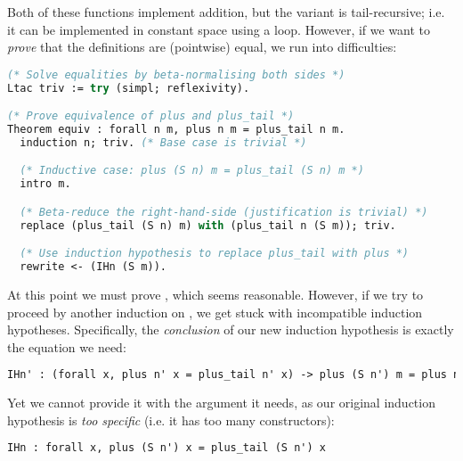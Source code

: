 \documentclass[]{article}
\begin{document}
\iffalse
Haskell equivalent:

plus :: Nat -> Nat -> Nat
plus      n  Z    = n
plus      n (S m) = S (plus n m)

plus_tail :: Nat -> Nat -> Nat
plus_tail n  Z    = n
plus_tail n (S m) = plus_tail (S n) m
\fi

Both of these functions implement addition, but the  variant is tail-recursive; i.e. it can be implemented in constant space using a loop. However, if we want to \emph{prove} that the definitions are (pointwise) equal, we run into difficulties:

\begin{lstlisting}[language=ML, xleftmargin=.2\textwidth, xrightmargin=.2\textwidth]
(* Solve equalities by beta-normalising both sides *)
Ltac triv := try (simpl; reflexivity).

(* Prove equivalence of plus and plus_tail *)
Theorem equiv : forall n m, plus n m = plus_tail n m.
  induction n; triv. (* Base case is trivial *)

  (* Inductive case: plus (S n) m = plus_tail (S n) m *)
  intro m.

  (* Beta-reduce the right-hand-side (justification is trivial) *)
  replace (plus_tail (S n) m) with (plus_tail n (S m)); triv.

  (* Use induction hypothesis to replace plus_tail with plus *)
  rewrite <- (IHn (S m)).
\end{lstlisting}

At this point we must prove , which seems reasonable. However, if we try to proceed by another induction on , we get stuck with incompatible induction hypotheses. Specifically, the \emph{conclusion} of our new induction hypothesis is exactly the equation we need:

\begin{lstlisting}[language=ML, xleftmargin=.2\textwidth, xrightmargin=.2\textwidth]
IHn' : (forall x, plus n' x = plus_tail n' x) -> plus (S n') m = plus n' (S m)
\end{lstlisting}

Yet we cannot provide it with the argument it needs, as our original induction hypothesis is \emph{too specific} (i.e. it has too many  constructors):

\begin{lstlisting}[language=ML, xleftmargin=.2\textwidth, xrightmargin=.2\textwidth]
IHn : forall x, plus (S n') x = plus_tail (S n') x
\end{lstlisting}
\end{document}
